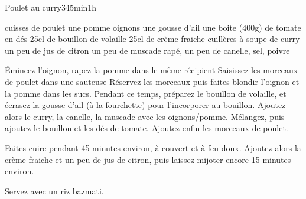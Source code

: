 \begin{recette}{Poulet au curry}{3}{45min}{1h}

\begin{ingredients}
 cuisses de poulet
\ingredient une pomme
 oignons
\ingredient une gousse d'ail
\ingredient une boite (400g) de tomate en dés 
\ingredient 25cl de bouillon de volaille
\ingredient 25cl de crème fraiche
 cuillères à soupe de curry
\ingredient un peu de jus de citron
\ingredient un peu de muscade rapé, un peu de canelle, sel, poivre
\end{ingredients}

\begin{preparation}
\etape Émincez l'oignon, rapez la pomme dans le même récipient
\etape Saisissez les morceaux de poulet dans une sauteuse
\etape Réservez les morceaux puis faites blondir l'oignon et la pomme dans les sucs.
\etape Pendant ce temps, préparez le bouillon de volaille, et écrasez la gousse d'ail (à la fourchette) pour l'incorporer au 
bouillon.
\etape Ajoutez alors le curry, la canelle, la muscade avec les oignons/pomme. Mélangez, puis ajoutez le bouillon et les dés de 
tomate. Ajoutez enfin les morceaux de poulet.
\end{preparation}

\begin{cuisson}
Faites cuire pendant 45 minutes environ, à couvert et à feu doux. Ajoutez alors la crème fraiche et un peu de jus 
de citron, puis laissez mijoter encore 15 minutes environ. 

Servez avec un riz bazmati.
\end{cuisson}
\end{recette}

